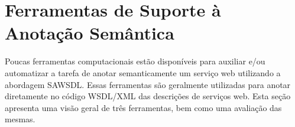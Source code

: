 \section{Ferramentas de Suporte à Anotação Semântica}\label{2-fundamentacao-ferramentas-de-suporte}

Poucas ferramentas computacionais estão disponíveis para auxiliar e/ou automatizar a tarefa de anotar semanticamente um serviço web utilizando a abordagem SAWSDL. Essas ferramentas são geralmente utilizadas para anotar diretamente no código WSDL/XML das descrições de serviços web. Esta seção apresenta uma visão geral de três ferramentas, bem como uma avaliação das mesmas.





%